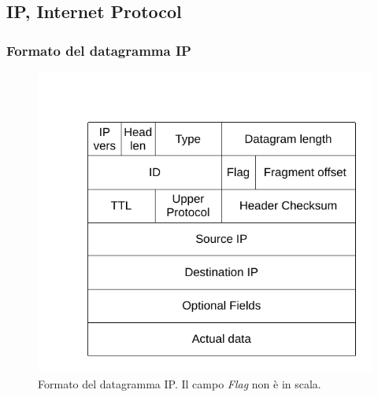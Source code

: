 \documentclass[12pt,a4paper]{article}
\begin{document}
\subsection{IP, Internet Protocol}
\subsubsection{Formato del datagramma IP}
\begin{figure}[H]
\centering
\includegraphics{img/3/IP-header.pdf}
\caption{Formato del datagramma IP. Il campo \emph{Flag} non è in scala.}
\end{figure}
\end{document}
